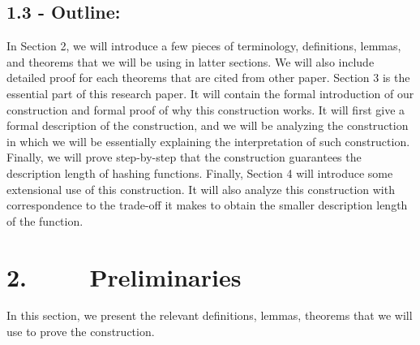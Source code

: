 \documentclass[a4paper, english]{paper}
\begin{document}
	\subsection{1.3 - Outline:} 
\quad	In Section 2, we will introduce a few pieces of terminology, definitions, lemmas, and theorems that we will be using in latter sections. We will also include detailed proof for each theorems that are cited from other paper. Section 3 is the essential part of this research paper. It will contain the formal introduction of our construction and formal proof of why this construction works. It will first give a formal description of the construction, and we will be analyzing the construction in which we will be essentially explaining the interpretation of such construction. Finally, we will prove step-by-step that the construction guarantees the description length of hashing functions. Finally, Section 4 will introduce some extensional use of this construction. It will also analyze this construction with correspondence to the trade-off it makes to obtain the smaller description length of the function. \\
	
	\section{2. $\qquad$ Preliminaries}
\quad	In this section, we present the relevant definitions, lemmas, theorems that we will use to prove the construction.  \\
	
\end{document}
